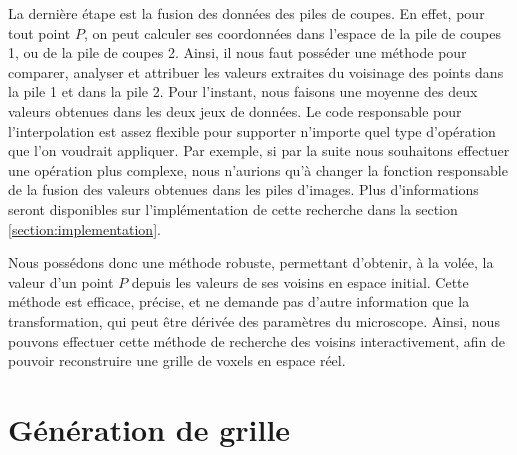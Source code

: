 {{{            La dernière étape est la fusion des données des piles de coupes. En effet, pour tout point $P$, on peut calculer ses coordonnées dans l'espace de la pile de coupes 1, ou de la pile de coupes 2. Ainsi, il nous faut posséder une méthode pour comparer, analyser et attribuer les valeurs extraites du voisinage des points dans la pile 1 et dans la pile 2. Pour l'instant, nous faisons une moyenne des deux valeurs obtenues dans les deux jeux de données. Le code responsable pour l'interpolation est assez flexible pour supporter n'importe quel type d'opération que l'on voudrait appliquer. Par exemple, si par la suite nous souhaitons effectuer une opération plus complexe, nous n'aurions qu'à changer la fonction responsable de la fusion des valeurs obtenues dans les piles d'images. Plus d'informations seront disponibles sur l'implémentation de cette recherche dans la section \ref{section:implementation}.
		}

        Nous possédons donc une méthode robuste, permettant d'obtenir, à la volée, la valeur d'un point $P$ depuis les valeurs de ses voisins en espace initial. Cette méthode est efficace, précise, et ne demande pas d'autre information que la transformation, qui peut être dérivée des paramètres du microscope. Ainsi, nous pouvons effectuer cette méthode de recherche des voisins interactivement, afin de pouvoir reconstruire une grille de voxels en espace réel.
	}
    
	\section{Génération de grille}\label{section:grid_generation}
	{

}}
